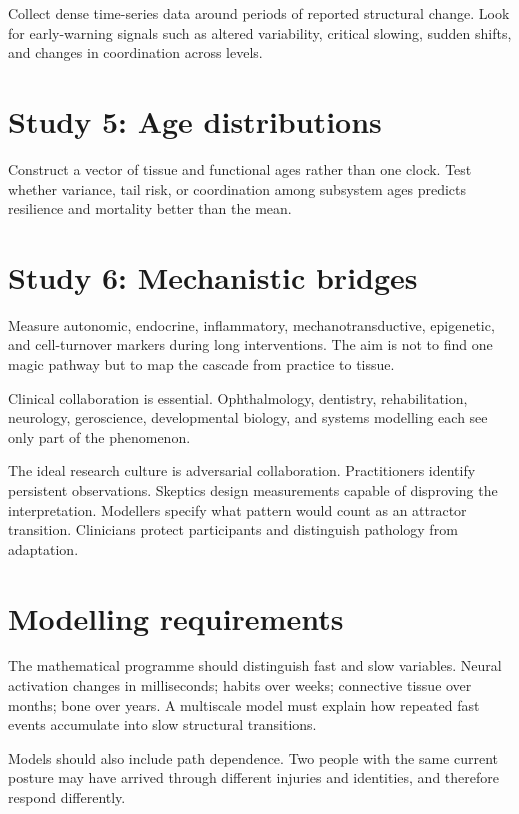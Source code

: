 Collect dense time-series data around periods of reported structural change. Look for early-warning signals such as altered variability, critical slowing, sudden shifts, and changes in coordination across levels.

\section{Study 5: Age distributions}\label{study-5-age-distributions}

Construct a vector of tissue and functional ages rather than one clock. Test whether variance, tail risk, or coordination among subsystem ages predicts resilience and mortality better than the mean.

\section{Study 6: Mechanistic bridges}\label{study-6-mechanistic-bridges}

Measure autonomic, endocrine, inflammatory, mechanotransductive, epigenetic, and cell-turnover markers during long interventions. The aim is not to find one magic pathway but to map the cascade from practice to tissue.

Clinical collaboration is essential. Ophthalmology, dentistry, rehabilitation, neurology, geroscience, developmental biology, and systems modelling each see only part of the phenomenon.

The ideal research culture is adversarial collaboration. Practitioners identify persistent observations. Skeptics design measurements capable of disproving the interpretation. Modellers specify what pattern would count as an attractor transition. Clinicians protect participants and distinguish pathology from adaptation.

\section{Modelling requirements}\label{modelling-requirements}

The mathematical programme should distinguish fast and slow variables. Neural activation changes in milliseconds; habits over weeks; connective tissue over months; bone over years. A multiscale model must explain how repeated fast events accumulate into slow structural transitions.

Models should also include path dependence. Two people with the same current posture may have arrived through different injuries and identities, and therefore respond differently.

